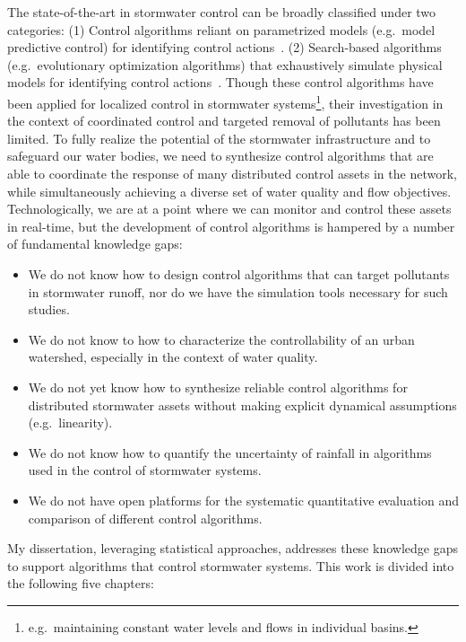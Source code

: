 The state-of-the-art in stormwater control  can be broadly classified under two categories: (1) Control algorithms reliant on parametrized models (e.g.\ model predictive control) for identifying control actions~\cite{Wong_Kerkez_2018, Ocampo-Martinez_2015,joseph2014hybrid, Sun_2020, lund2020cso}. (2) Search-based algorithms (e.g.\ evolutionary optimization algorithms) that exhaustively simulate physical models for identifying control actions~\cite{shishegar2018optimization,sadler2019, lund2018, Rjeily_2018, Meneses_2018, vezzaro2014}.
Though these control algorithms have been applied for localized control in stormwater systems\footnote{e.g.\ maintaining constant water levels and flows in individual basins.}, their investigation in the context of coordinated control and targeted removal of pollutants has been limited.
To fully realize the potential of the stormwater infrastructure and to safeguard our water bodies, we need to synthesize control algorithms that are able to coordinate the response of many distributed control assets in the network, while simultaneously achieving a diverse set of water quality and flow objectives. 
Technologically, we are at a point where we can monitor and control these assets in real-time, but the development of control algorithms is hampered by a number of fundamental knowledge gaps:
\begin{itemize}
	\item We do not know how to design control algorithms that can target pollutants in stormwater runoff, nor do we have the simulation tools necessary for such studies.
	\item We do not know to how to characterize the controllability of an urban watershed, especially in the context of water quality.
	\item We do not yet know how to synthesize reliable control algorithms for distributed stormwater assets without making explicit dynamical assumptions (e.g.\ linearity).
	\item We do not know how to quantify the uncertainty of rainfall in algorithms used in the control of stormwater systems.
	\item We do not have open platforms for the systematic quantitative evaluation and comparison of different control algorithms.
\end{itemize}

My dissertation, leveraging statistical approaches, addresses these knowledge gaps to support algorithms that control stormwater systems. This work is divided into the following five chapters:

